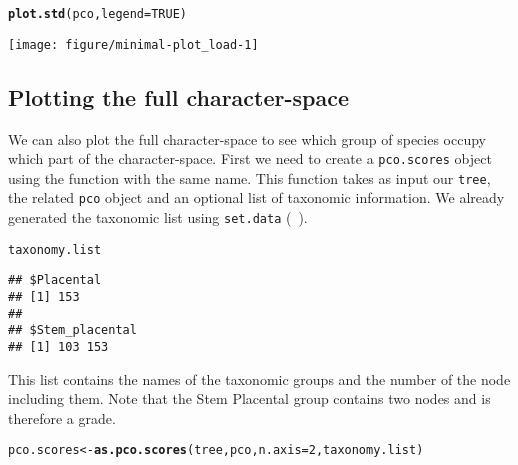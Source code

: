\documentclass[a4paper,11pt]{article}\usepackage[]{graphicx}\usepackage[]{color}
\makeatletter
\def\maxwidth{ %
  \ifdim\Gin@nat@width>\linewidth
    \linewidth
  \else
    \Gin@nat@width
  \fi
}
\newcommand{\hlnum}[1]{\textcolor[rgb]{0.686,0.059,0.569}{#1}}%
\newcommand{\hlstd}[1]{\textcolor[rgb]{0.345,0.345,0.345}{#1}}%
\newcommand{\hlkwb}[1]{\textcolor[rgb]{0.69,0.353,0.396}{#1}}%
\newcommand{\hlkwc}[1]{\textcolor[rgb]{0.333,0.667,0.333}{#1}}%
\newcommand{\hlkwd}[1]{\textcolor[rgb]{0.737,0.353,0.396}{\textbf{#1}}}%
\newenvironment{kframe}{%
 \def\at@end@of@kframe{}%
 \ifinner\ifhmode%
  \def\at@end@of@kframe{\end{minipage}}%
  \begin{minipage}{\columnwidth}%
 \fi\fi%
 \def\FrameCommand##1{\hskip\@totalleftmargin \hskip-\fboxsep
 \colorbox{shadecolor}{##1}\hskip-\fboxsep
     \hskip-\linewidth \hskip-\@totalleftmargin \hskip\columnwidth}%
 \MakeFramed {\advance\hsize-\width
   \@totalleftmargin\z@ \linewidth\hsize
   \@setminipage}}%
 {\par\unskip\endMakeFramed%
 \at@end@of@kframe}
\newenvironment{knitrout}{}{} %
\makeatother
\begin{document}
\begin{knitrout}
\color{fgcolor}\begin{kframe}
\begin{alltt}
\hlkwd{plot.std}\hlstd{(pco,} \hlkwc{legend}\hlstd{=}\hlnum{TRUE}\hlstd{)}
\end{alltt}
\end{kframe}

{\centering \texttt{[image: figure/minimal-plot\_load-1]} 

}



\end{knitrout}

\subsection{Plotting the full character-space}
We can also plot the full character-space to see which group of species occupy which part of the character-space.
First we need to create a \texttt{pco.scores} object using the function with the same name.
This function takes as input our \texttt{tree}, the related \texttt{pco} object and an optional list of taxonomic information.
We already generated the taxonomic list using \texttt{set.data} (~\label{data}).

\begin{knitrout}
\color{fgcolor}\begin{kframe}
\begin{alltt}
\hlstd{taxonomy.list}
\end{alltt}
\begin{verbatim}
## $Placental
## [1] 153
## 
## $Stem_placental
## [1] 103 153
\end{verbatim}
\end{kframe}
\end{knitrout}

This list contains the names of the taxonomic groups and the number of the node including them.
Note that the Stem Placental group contains two nodes and is therefore a grade.

\begin{knitrout}
\color{fgcolor}\begin{kframe}
\begin{alltt}
\hlstd{pco.scores}\hlkwb{<-}\hlkwd{as.pco.scores}\hlstd{(tree, pco,} \hlkwc{n.axis}\hlstd{=}\hlnum{2}\hlstd{, taxonomy.list)}
\end{alltt}
\end{kframe}
\end{knitrout}
\end{document}
